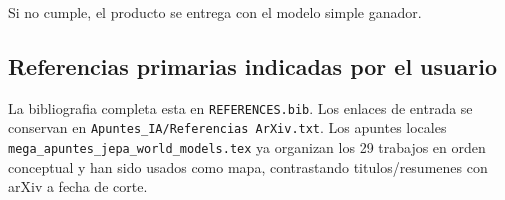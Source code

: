 \documentclass[
  spanish,
  10pt,
  a4paper,
]{article}
\begin{document}
Si no cumple, el producto se entrega con el modelo simple ganador.

\subsection{Referencias primarias indicadas por el
usuario}\label{referencias-primarias-indicadas-por-el-usuario}

La bibliografia completa esta en \texttt{REFERENCES.bib}. Los enlaces de
entrada se conservan en \texttt{Apuntes\_IA/Referencias\ ArXiv.txt}. Los
apuntes locales \texttt{mega\_apuntes\_jepa\_world\_models.tex} ya
organizan los 29 trabajos en orden conceptual y han sido usados como
mapa, contrastando titulos/resumenes con arXiv a fecha de corte.
\end{document}
